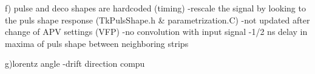 f) pulse and deco shapes are hardcoded (timing)
-rescale  the signal by looking to the puls shape response (TkPulsShape.h & parametrization.C)
-not updated after change of APV settings (VFP)
-no convolution with input signal
-1/2 ns delay in maxima of puls shape between neighboring strips

g)lorentz angle
-drift direction compu



